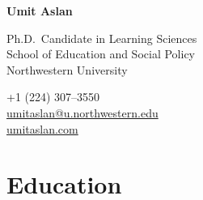 \documentclass[11pt,letterpaper]{report} %
\newcommand{\myname}{Umit Aslan}
\newcommand{\namefont}[1]{{\normalfont\bfseries\Huge{#1}}}
\begin{document}
    \raggedright{}

    \namefont{\myname}

    \vspace{1em}
    \begin{minipage}[t]{0.700\textwidth}
        Ph.D.\ Candidate in Learning Sciences \\
        School of Education and Social Policy \\
        Northwestern University
    \end{minipage}
    \begin{minipage}[t]{0.295\textwidth}
        \raggedleft{}
        +1 (224) 307--3550 \\
        \href{mailto:umitaslan@u.northwestern.edu}{umitaslan@u.northwestern.edu} \\
        \href{https://umitaslan.com}{umitaslan.com}
    \end{minipage}




    \section*{Education}
\end{document}

